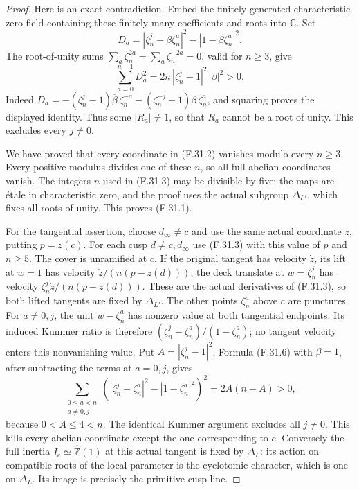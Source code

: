 \begin{proof}
Here is an exact contradiction.
Embed the finitely generated characteristic-zero
field containing these finitely many coefficients
and roots into $\mathbb C$.
Set
\[
 D_a=|\zeta_n^j-\beta\zeta_n^a|^2
                   -|1-\beta\zeta_n^a|^2.
\]
The root-of-unity sums
$\sum_a\zeta_n^{2a}=\sum_a\zeta_n^{-2a}=0$,
valid for $n\geq3$, give
\[
 \sum_{a=0}^{n-1}D_a^2
       =2n\,|\zeta_n^j-1|^2\,|\beta|^2>0.                \tag{F.31.6}
\]
Indeed
$D_a=-(\zeta_n^j-1)\overline\beta\,\zeta_n^{-a}
      -(\zeta_n^{-j}-1)\beta\,\zeta_n^a$,
and squaring proves the displayed identity.
Thus some $|R_a|\ne1$, so that $R_a$ cannot be a
root of unity.  This excludes every $j\ne0$.

We have proved that every coordinate in (F.31.2)
vanishes modulo every $n\geq3$.
Every positive modulus divides one of these $n$,
so all full abelian coordinates vanish.
The integers $n$ used in (F.31.3) may be divisible
by five: the maps are \'etale in characteristic zero,
and the proof uses the actual subgroup
$\Delta_{L'}$, which fixes all roots of unity.
This proves (F.31.1).

For the tangential assertion, choose
$d_\infty\ne c$ and use the same actual coordinate
$z$, putting $p=z(c)$.
For each cusp $d\ne c,d_\infty$ use
(F.31.3) with this value of $p$ and $n\geq5$.
The cover is unramified at $c$.
If the original tangent has velocity $\dot z$,
its lift at $w=1$ has velocity
$\dot z/(n(p-z(d)))$; the deck translate at
$w=\zeta_n^j$ has velocity
$\zeta_n^j\dot z/(n(p-z(d)))$.
These are the actual derivatives of (F.31.3),
so both lifted tangents are fixed by $\Delta_{L'}$.
The other points $\zeta_n^a$ above $c$ are punctures.
For $a\ne0,j$, the unit $w-\zeta_n^a$ has
nonzero value at both tangential endpoints.
Its induced Kummer ratio is therefore
$(\zeta_n^j-\zeta_n^a)/(1-\zeta_n^a)$;
no tangent velocity enters this nonvanishing value.
Put $A=|\zeta_n^j-1|^2$.
Formula (F.31.6) with $\beta=1$, after subtracting
the terms at $a=0,j$, gives
\[
 \sum_{\substack{0\leq a<n\\a\ne0,j}}
 \left(|\zeta_n^j-\zeta_n^a|^2
                  -|1-\zeta_n^a|^2\right)^2
                      =2A(n-A)>0,                       \tag{F.31.7}
\]
because $0<A\leq4<n$.
The identical Kummer argument excludes all $j\ne0$.
This kills every abelian coordinate except the
one corresponding to $c$.
Conversely the full inertia
$I_c\simeq\widehat{\mathbb Z}(1)$ at this actual
tangent is fixed by $\Delta_L$:
its action on compatible roots of the local
parameter is the cyclotomic character, which is
one on $\Delta_L$.
Its image is precisely the primitive cusp line.


\end{proof}

